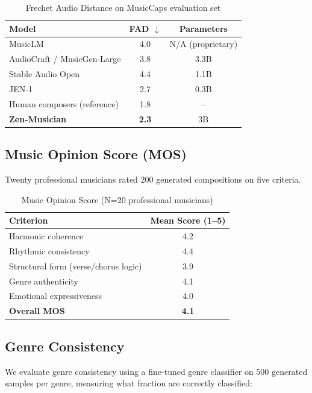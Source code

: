 \documentclass[11pt,a4paper]{article}
\begin{document}
\begin{table}[H]
\centering
\begin{tabular}{lcc}
\toprule
\textbf{Model} & \textbf{FAD} $\downarrow$ & \textbf{Parameters} \\
\midrule
MusicLM & 4.0 & N/A (proprietary) \\
AudioCraft / MusicGen-Large & 3.8 & 3.3B \\
Stable Audio Open & 4.4 & 1.1B \\
JEN-1 & 2.7 & 0.3B \\
Human composers (reference) & 1.8 & -- \\
\textbf{Zen-Musician} & \textbf{2.3} & 3B \\
\bottomrule
\end{tabular}
\caption{Frechet Audio Distance on MusicCaps evaluation set}
\end{table}

\subsection{Music Opinion Score (MOS)}

Twenty professional musicians rated 200 generated compositions on five criteria.

\begin{table}[H]
\centering
\begin{tabular}{lc}
\toprule
\textbf{Criterion} & \textbf{Mean Score (1--5)} \\
\midrule
Harmonic coherence & 4.2 \\
Rhythmic consistency & 4.4 \\
Structural form (verse/chorus logic) & 3.9 \\
Genre authenticity & 4.1 \\
Emotional expressiveness & 4.0 \\
\midrule
\textbf{Overall MOS} & \textbf{4.1} \\
\bottomrule
\end{tabular}
\caption{Music Opinion Score (N=20 professional musicians)}
\end{table}

\subsection{Genre Consistency}

We evaluate genre consistency using a fine-tuned genre classifier on 500 generated samples
per genre, measuring what fraction are correctly classified:
\end{document}
